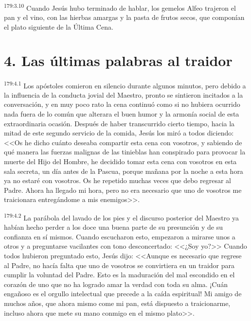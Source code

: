 \par 
\textsuperscript{179:3.10} Cuando Jesús hubo terminado de hablar, los gemelos Alfeo trajeron el pan y el vino, con las hierbas amargas y la pasta de frutos secos, que componían el plato siguiente de la
Última Cena.

\section*{4. Las últimas palabras al traidor}
\par 
\textsuperscript{179:4.1} Los apóstoles comieron en silencio durante algunos minutos, pero debido a la influencia de la conducta jovial del Maestro, pronto se sintieron incitados a la conversación, y en muy poco rato la cena continuó como si no hubiera ocurrido nada fuera de lo común que alterara el buen humor y la armonía social de esta extraordinaria ocasión. Después de haber transcurrido cierto tiempo, hacia la mitad de este segundo servicio de la comida, Jesús los miró a todos diciendo: <<Os he dicho cuánto deseaba compartir esta cena con vosotros, y sabiendo de qué manera las fuerzas malignas de las tinieblas han conspirado para provocar la muerte del Hijo del Hombre, he decidido tomar esta cena con vosotros en esta sala secreta, un día antes de la Pascua, porque mañana por la noche a esta hora ya no estaré con vosotros. Os he repetido muchas veces que debo regresar al Padre. Ahora ha llegado mi hora, pero no era necesario que uno de vosotros me traicionara entregándome a mis enemigos>>.

\par 
\textsuperscript{179:4.2} La parábola del lavado de los pies y el discurso posterior del Maestro ya habían hecho perder a los doce una buena parte de su presunción y de su confianza en sí mismos. Cuando escucharon esto, empezaron a mirarse unos a otros y a preguntarse vacilantes con tono desconcertado: <<¿Soy yo?>> Cuando todos hubieron preguntado esto, Jesús dijo: <<Aunque es necesario que regrese al Padre, no hacía falta que uno de vosotros se convirtiera en un traidor para cumplir la voluntad del Padre. Esto es la maduración del mal escondido en el corazón de uno que no ha logrado amar la verdad con toda su alma. ¡Cuán engañoso es el orgullo intelectual que precede a la caída espiritual! Mi amigo de muchos años, que ahora mismo come mi pan, está dispuesto a traicionarme, incluso ahora que mete su mano conmigo en el mismo plato>>.

